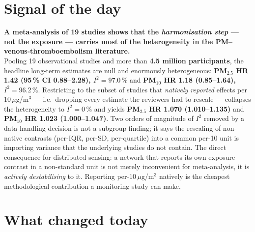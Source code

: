 \documentclass[10pt]{article}
\begin{document}
\vspace{5mm}

\section*{\sffamily\bfseries\color{Deep}Signal of the day}
\vspace{-1.5mm}{\color{Amber}\rule{\linewidth}{1.1pt}}\vspace{2.5mm}

\begin{keybox}
{\sffamily\bfseries\small\color{Deep}A meta-analysis of 19 studies shows that the
\emph{harmonisation step} --- not the exposure --- carries most of the heterogeneity in
the PM--venous-thromboembolism literature.}\\[1.4mm]
\footnotesize
Pooling 19 observational studies and more than \textbf{4.5 million participants}, the
headline long-term estimates are null and enormously heterogeneous:
\textbf{PM$_{2.5}$ HR 1.42 (95\,\% CI 0.88--2.28), $I^2 = 97.0\,\%$} and
\textbf{PM$_{10}$ HR 1.18 (0.85--1.64), $I^2 = 96.2\,\%$}. Restricting to the subset of
studies that \emph{natively reported} effects per 10\,$\mu$g/m$^3$ --- i.e.\ dropping
every estimate the reviewers had to rescale --- collapses the heterogeneity to
\textbf{$I^2 = 0\,\%$} and yields \textbf{PM$_{2.5}$ HR 1.070 (1.010--1.135)} and
\textbf{PM$_{10}$ HR 1.023 (1.000--1.047)}. Two orders of magnitude of $I^2$ removed by a
data-handling decision is not a subgroup finding; it says the rescaling of
non-native contrasts (per-IQR, per-SD, per-quartile) into a common per-10 unit is
importing variance that the underlying studies do not contain. The direct consequence
for distributed sensing: a network that reports its own exposure contrast in a
non-standard unit is not merely inconvenient for meta-analysis, it is
\emph{actively destabilising} to it. Reporting per-10\,$\mu$g/m$^3$ natively is the
cheapest methodological contribution a monitoring study can make.
\end{keybox}

\vspace{2mm}

\section*{\sffamily\bfseries\color{Deep}What changed today}
\vspace{-1.5mm}{\color{Amber}\rule{\linewidth}{1.1pt}}\vspace{2.5mm}
\end{document}
